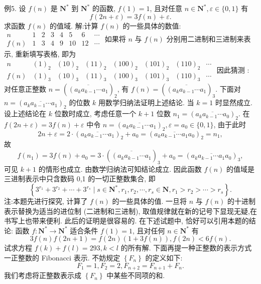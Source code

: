 例5. 设 $f(n)$ 是 $\mathbf{N}^*$ 到 $\mathbf{N}^*$ 的函数, $f(1)=1$, 且对任意 $n \in \mathbf{N}^*, \varepsilon \in\{0,1\}$ 有
$$
f(2 n+\varepsilon)=3 f(n)+\varepsilon .
$$
求函数 $f(n)$ 的值域.
解:计算 $f(n)$ 的一些具体的数值:
$\begin{array}{cccccccc}n & 1 & 2 & 3 & 4 & 5 & 6 & \cdots \\ f(n) & 1 & 3 & 4 & 9 & 10 & 12 & \cdots\end{array}$
如果将 $n$ 与 $f(n)$ 分别用二进制和三进制来表示, 重新填写表格, 即为
$\begin{array}{cccccccc}n & (1)_2 & (10)_2 & (11)_2 & (100)_2 & (101)_2 & (110)_2 & \cdots \\ f(n) & (1)_3 & (10)_3 & (11)_3 & (100)_3 & (101)_3 & (110)_3 & \cdots\end{array}$
因此猜测 : 对任意正整数 $n=\left(\overline{\left(a_k a_{k-1} \cdots a_1\right.}\right)_2$, 有 $f(n)=\left(\overline{\left(a_k a_{k-1} \cdots a_1\right.}\right)_3$.
下面对 $n=\left(\overline{a_k a_{k-1} \cdots a_1}\right)_2$ 的位数 $k$ 用数学归纳法证明上述结论.
当 $k=1$ 时显然成立.
设上述结论在 $k$ 位数时成立, 考虑任意一个 $k+1$ 位数 $n_1= \left(\overline{a_k a_{k-1} \cdots a_0}\right)_2$.
在 $f(2 n+\varepsilon)=3 f(n)+\varepsilon$ 中令 $n=\left(\overline{a_k a_{k-1} \cdots a_1}\right)_2, \varepsilon=a_0 \in\{0,1\}$, 由于此时
$$
2 n+\varepsilon=2 \cdot\left(\overline{a_k a_{k-1} \cdots a_1}\right)_2+a_0=\left(\overline{a_k a_{k-1} \cdots a_1 a_0}\right)_2=n_1,
$$
故
$$
f\left(n_1\right)=3 f(n)+a_0=3 \cdot\left(\overline{\left(a_k a_{k-1} \cdots a_1\right.}\right)_3+a_0=\left(\overline{a_k a_{k-1} \cdots a_1 a_0}\right)_3,
$$
可见 $k+1$ 的情形也成立.
由数学归纳法可知结论成立.
因此函数 $f(n)$ 的值域是三进制表示中只含数码 0,1 的一切正整数集合, 即
$$
\left\{3^{r_1}+3^{r_2}+\cdots+3^{r_s} \mid s \in \mathbf{N}^*, r_1, r_2, \cdots, r_s \in \mathbf{N}, r_1>r_2>\cdots>r_s\right\} .
$$
注:本题先进行探究, 计算了 $f(n)$ 的一些具体的值.
一旦将 $n$ 与 $f(n)$ 的十进制表示替换为适当的进位制 (二进制和三进制), 取值规律就在新的记号下显现无疑,在书写上也带来便利.
此后的证明是很容易的.
在下述试题中, 恰好可以引用本题的结论:
函数 $f: \mathbf{N}^* \rightarrow \mathbf{N}^*$ 适合条件 $f(1)=1$, 且对任何 $n \in \mathbf{N}^*$ 有
$$
3 f(n) f(2 n+1)=f(2 n)(1+3 f(n)), f(2 n)<6 f(n) .
$$
试求方程 $f(k)+f(l)=293, k<l$ 的所有解.
下面再提一种正整数的表示方式一正整数的 Fibonacci 表示.
不妨规定 $\left\{F_n\right\}$ 的定义如下:
$$
F_1=1, F_2=2, F_{n+2}=F_{n+1}+F_n .
$$
我们考虑将正整数表示成 $\left\{F_n\right\}$ 中某些不同项的和.
